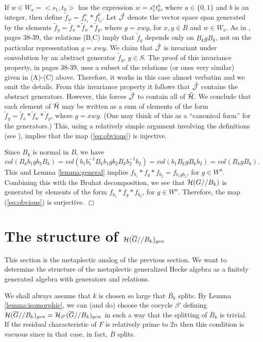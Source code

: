 If $w\in W_a=<s_1,t_0>$ has the expression
$w=s_1^a t_0^b$, where $a\in \{0,1\}$ and $b$ is an integer,
then define $\tilde{f}_w=f_{s_1}^a*f_{t_0}^b$.
Let $\tilde{\cal J}$ denote the 
vector space span generated by the elements 
$\tilde{f}_g=\tilde{f}_x*\tilde{f}_w*\tilde{f}_y$, where
$g=xwy$, for $x,y\in B$ and $w \in W_a$. 
As in \cite{H}, pages 38-39, the relations (B,C) 
imply that $\tilde{f}_g$ depends only on $B_kgB_k$,
not on the particular representation $g=xwy$.
We claim that 
$\tilde{\cal J}$ is invariant under convolution by 
an abstract generator $\tilde{f}_g$, $g\in S$.
The proof of this invariance property, in \cite{H} pages 38-39,
uses a subset of the relations (or ones very similar) given in
(A)-(C) above. Therefore, it works in this case almost
verbatim and we omit the details. 
From this invariance property it follows that $\tilde{\cal J}$
contains the abstract generators. However, this
forces $\tilde{\cal J}$ to contain all of 
$\tilde{\cal H}$. We
conclude that each element of $\tilde{\cal H}$
may be written as a sum of elements of the form 
$\tilde{f}_g=\tilde{f}_x*\tilde{f}_w*\tilde{f}_y$, where
$g=xwy$. (One may think of this as a
``canonical form'' for the generators.)
This, using a relatively simple argument involving the
definitions (see \cite{H}), implies that the map (\ref{eq:obvious}) is 
injective.  

Since $B_k$ is normal in $B$, we have
\[
vol(B_k b_1g b_2 B_k)=vol(b_1 b_1^{-1}B_k b_1 g b_2 B_k b_2^{-1} b_2)=
vol(b_1 B_k g B_kb_2)=vol(B_k g B_k).
\]
This and Lemma \ref{lemma:general} implies 
$f_{b_1}*f_g*f_{b_2}=f_{b_1gb_2}$, for $g\in W^a$. 
Combining this with the Bruhat decomposition, we see
that ${\cal H}(G//B_k)$ is generated by elements of the form
$f_{b_1}*f_g*f_{b_2}$, for $g\in W^a$. 
Therefore, the map (\ref{eq:obvious}) is surjective.      $\Box$ 


\section{The structure of ${\cal H}(\overline{G}//B_k)_{gen}$}
\label{section:metaplectic}

This section is the metaplectic analog of the previous section.
We want to determine the structure of the metaplectic
generalized Hecke algebra as
a finitely generated algebra with generators and relations. 

We shall
always assume that $k$ is chosen so large 
that $\overline{B_k}$ splits.
By Lemma \ref{lemma:isomorphic},
we can (and do) choose the cocycle ${\beta'}$ defining
${\cal H}(\overline{G}//B_k)_{gen}=
{\cal H}_{\beta'}(\overline{G}//B_k)_{gen}$
in such a way that the splitting of 
$\overline{B}_k$ is trivial.
If the residual characteristic of $F$ is relatively
prime to $2n$ then this condition is
vacuous since in that case, in fact,
$\overline{B}$ splits.

